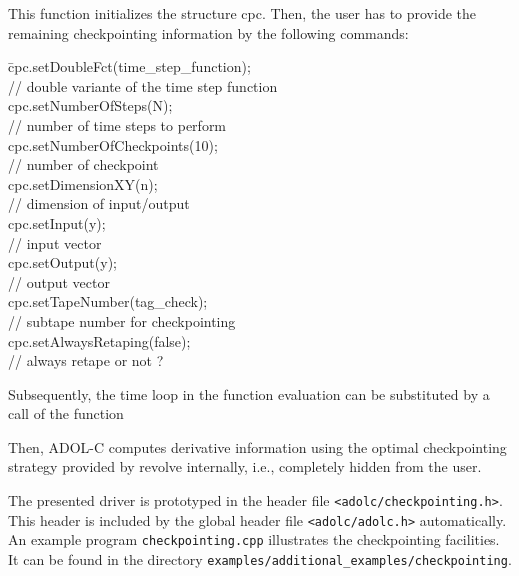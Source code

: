 \documentclass[11pt,twoside]{article}
\begin{document}
\noindent
This function initializes the structure {\sf cpc}. Then, 
the user has to provide the remaining checkpointing information
by the following commands:
\begin{tabbing}
\hspace*{2cm}\= {\sf cpc.setDoubleFct(time\_step\_function);}\\
             \> {\sf // double variante of the time step function}\\
             \> {\sf cpc.setNumberOfSteps(N);}\\
             \> {\sf // number of time steps to perform}\\
             \> {\sf cpc.setNumberOfCheckpoints(10);}\\
             \> {\sf // number of checkpoint} \\
             \> {\sf cpc.setDimensionXY(n);}\\
             \> {\sf // dimension of input/output}\\
             \> {\sf cpc.setInput(y);}\\
             \> {\sf // input vector} \\
             \> {\sf cpc.setOutput(y);}\\
             \> {\sf // output vector }\\
             \> {\sf cpc.setTapeNumber(tag\_check);}\\
             \> {\sf // subtape number for checkpointing} \\
             \> {\sf cpc.setAlwaysRetaping(false);}\\
             \> {\sf // always retape or not ?}
\end{tabbing}
Subsequently, the time loop in the function evaluation can be
substituted by a call of the function
\medskip

\noindent
\hspace*{2cm}{\sf int cpc.checkpointing();}
\medskip

\noindent
Then, ADOL-C computes derivative information using the optimal checkpointing
strategy provided by {\sf revolve} internally, i.e., completely hidden from the user.

The presented driver is prototyped in the header file 
\verb=<adolc/checkpointing.h>=. This header
is included by the global header file \verb=<adolc/adolc.h>= automatically. 
An example program \verb=checkpointing.cpp= illustrates the
checkpointing facilities. It can be found in the directory \verb=examples/additional_examples/checkpointing=.
%
%
%
\end{document}
